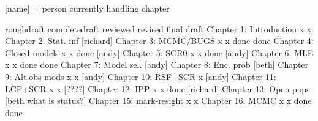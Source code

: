 [name] = person currently handling chapter


                          roughdraft   completedraft  reviewed  revised  final draft
Chapter 1: Introduction       x              x
Chapter 2: Stat. inf        [richard]
Chapter 3: MCMC/BUGS          x              x         done      done
Chapter 4: Closed models      x              x         done     [andy]
Chapter 5: SCR0               x              x         done     [andy]
Chapter 6: MLE                x              x         done      done
Chapter 7: Model sel.       [andy]
Chapter 8: Enc. prob        [beth]
Chapter 9: Alt.obs mods       x              x        [andy]
Chapter 10: RSF+SCR           x           [andy]
Chapter 11: LCP+SCR           x              x        [????]
Chapter 12: IPP               x              x         done     [richard]
Chapter 13: Open pops       [beth what is status?]
Chapter 15: mark-resight      x              x        
Chapter 16: MCMC              x              x         done      done


